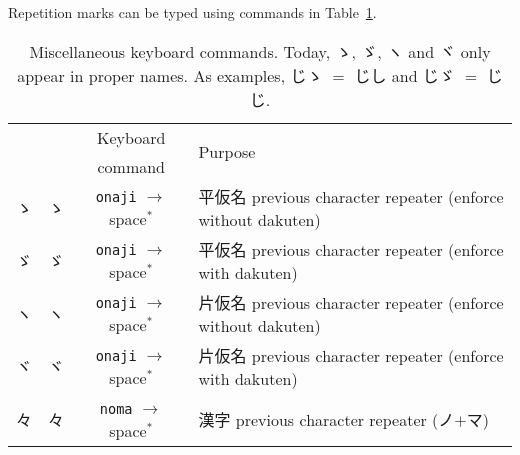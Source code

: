 \documentclass[../nihongo-gakushuu-kyouzai.tex]{subfiles}
\begin{document}
Repetition marks can be typed using commands in Table~\ref{tbl:miscellaneous-keyboard-commands}.
\begin{table}[h]
\centering
\begin{tabular}{@{}cccl@{}}
    \toprule
    \multicolumn{2}{c}{\multirow{2}{*}{}} & Keyboard & \multirow{2}{*}{Purpose} \\
    \multicolumn{2}{c}{}                  & command  & \\ \midrule
    ゝ & {\sffamily ゝ} & \texttt{onaji} $\to$ space$^\texttt{*}$ & 平仮名 previous character repeater (enforce without dakuten) \\
    ゞ & {\sffamily ゞ} & \texttt{onaji} $\to$ space$^\texttt{*}$ & 平仮名 previous character repeater (enforce with dakuten)\\
    ヽ & {\sffamily ヽ} & \texttt{onaji} $\to$ space$^\texttt{*}$ & 片仮名 previous character repeater (enforce without dakuten)\\
    ヾ & {\sffamily ヾ} & \texttt{onaji} $\to$ space$^\texttt{*}$ & 片仮名 previous character repeater (enforce with dakuten)\\
    々 & {\sffamily 々} & \texttt{noma} $\to$ space$^\texttt{*}$ & 漢字 previous character repeater (ノ$+$マ) \\
    \bottomrule
\end{tabular}%
\caption{Miscellaneous keyboard commands. Today, ゝ, ゞ, ヽ and ヾ only appear in proper names. As examples, じゝ $=$ じし and じゞ $=$ じじ.}
\label{tbl:miscellaneous-keyboard-commands}
\end{table}
\end{document}
